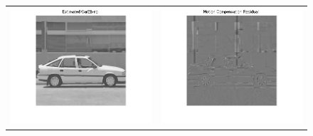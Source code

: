 \documentclass[article,oneside]{memoir}
\begin{document}
 \begin{center}
  \begin{figure}[ht]
  \begin{tabular}{@{} cc @{}}

  \begin{minipage}{0.5\hsize}
   \begin{center}
   \includegraphics[width=10cm]{../images/estimatedCar2.png}
   \end{center}
  \end{minipage}    &
  \begin{minipage}{0.5\hsize}
   \begin{center}
   \includegraphics[width=10cm]{../images/mcresidual.png}
   \end{center}
  \end{minipage}  
  \end{tabular}
 \end{figure} 
\end{center}
\end{document}
